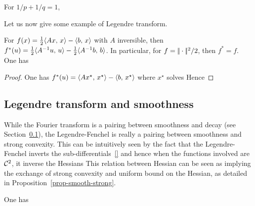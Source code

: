 \begin{prop}\label{prop-dual-lp}
	For $1/p+1/q=1$, 
\end{prop}


Let us now give some example of Legendre transform. 

\begin{prop}\label{eq-example-legendre}
	For $f(x)=\frac{1}{2}\langle Ax,\,x\rangle - \langle b,\,x\rangle$ with $A$ inversible, then $f^*(u) = \frac{1}{2}\langle A^{-1} u,\,u\rangle - \frac{1}{2}\langle A^{-1} b,\,b\rangle$.
	In particular, for $f=|\!| \cdot |\!|^2/2$, then $f^*=f$. 
	One has
\end{prop}
\begin{proof}
	One has $f^*(u) = \langle Ax^\star,\,x^\star\rangle - \langle b,\,x^\star\rangle$ where $x^\star$ solves
	Hence
	
\end{proof}


\subsection{Legendre transform and smoothness}

While the Fourier transform is a pairing between smoothness and decay (see Section~\ref{}), the Legendre-Fenchel is really a pairing between smoothness and strong convexity. This can be intuitively seen by the fact that the Legendre-Fenchel inverts the sub-differentials~\eqref{} and hence when the functions involved are $\mathcal{C}^2$, it inverse the Hessians 
This relation between Hessian can be seen as implying the exchange of strong convexity and uniform bound on the Hessian, as detailed in Proposition~\ref{prop-smooth-strong}.

\begin{prop}
	One has
\end{prop}

